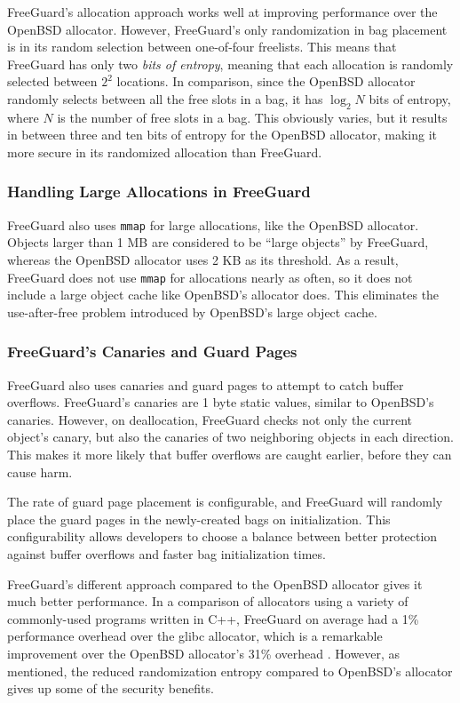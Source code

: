 \documentclass[conference]{IEEEtran}
\begin{document}
FreeGuard's allocation approach works well at improving performance over the OpenBSD allocator.
However, FreeGuard's only randomization in bag placement is in its random selection between one-of-four freelists.
This means that FreeGuard has only two \emph{bits of entropy}, meaning that each allocation is randomly selected between $2^2$ locations.
In comparison, since the OpenBSD allocator randomly selects between all the free slots in a bag, it has $\log_2{N}$ bits of entropy, where $N$ is the number of free slots in a bag.
This obviously varies, but it results in between three and ten bits of entropy for the OpenBSD allocator, making it more secure in its randomized allocation than FreeGuard.

\subsubsection{Handling Large Allocations in FreeGuard}
FreeGuard also uses \verb|mmap| for large allocations, like the OpenBSD allocator.
Objects larger than 1 MB are considered to be ``large objects'' by FreeGuard, whereas the OpenBSD allocator uses 2 KB as its threshold.
As a result, FreeGuard does not use \verb|mmap| for allocations nearly as often, so it does not include a large object cache like OpenBSD's allocator does.
This eliminates the use-after-free problem introduced by OpenBSD's large object cache.

\subsubsection{FreeGuard's Canaries and Guard Pages}
FreeGuard also uses canaries and guard pages to attempt to catch buffer overflows.
FreeGuard's canaries are 1 byte static values, similar to OpenBSD's canaries.
However, on deallocation, FreeGuard checks not only the current object's canary, but also the canaries of two neighboring objects in each direction.
This makes it more likely that buffer overflows are caught earlier, before they can cause harm.

The rate of guard page placement is configurable, and FreeGuard will randomly place the guard pages in the newly-created bags on initialization.
This configurability allows developers to choose a balance between better protection against buffer overflows and faster bag initialization times.

FreeGuard's different approach compared to the OpenBSD allocator gives it much better performance.
In a comparison of allocators using a variety of commonly-used programs written in C++, FreeGuard on average had a 1\% performance overhead over the glibc allocator, which is a remarkable improvement over the OpenBSD allocator's 31\% overhead \cite{guarder}.
However, as mentioned, the reduced randomization entropy compared to OpenBSD's allocator gives up some of the security benefits.
\end{document}

